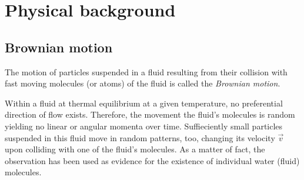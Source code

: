 \documentclass[.../bericht]{subfilies}
\begin{document}
\chapter{Physical background}

    \section{Brownian motion}
    \label{sec:brownian-motion}

      The motion of particles suspended in a fluid resulting from their collision with fast moving molecules (or atoms) of the fluid is called the \textit{Brownian motion}.

      Within a fluid at thermal equilibrium at a given temperature, no preferential direction of flow exists. Therefore, the movement the fluid's molecules is random yielding no linear or angular momenta over time. Suffieciently small particles suspended in this fluid move in random patterns, too, changing its velocity $\vec{v}$ upon colliding with one of the fluid's molecules. As a matter of fact, the observation has been used as evidence for the existence of individual water (fluid) molecules.
\end{document}
